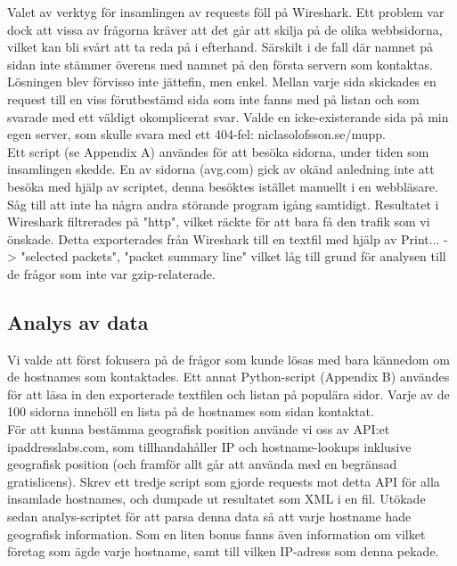 \documentclass[a4paper]{article}
\begin{document}
Valet av verktyg för insamlingen av requests föll på Wireshark. Ett problem var dock att vissa av frågorna kräver att det går att skilja på de olika webbsidorna, vilket kan bli svårt att ta reda på i efterhand. Särskilt i de fall där namnet på sidan inte stämmer överens med namnet på den första servern som kontaktas. Lösningen blev förvisso inte jättefin, men enkel. Mellan varje sida skickades en request till en viss förutbestämd sida som inte fanns med på listan och som svarade med ett väldigt okomplicerat svar. Valde en icke-existerande sida på min egen server, som skulle svara med ett 404-fel: niclasolofsson.se/mupp.\\

Ett script (se Appendix A) användes för att besöka sidorna, under tiden som insamlingen skedde. En av sidorna (avg.com) gick av okänd anledning inte att besöka med hjälp av scriptet, denna besöktes istället manuellt i en webbläsare.\\

Såg till att inte ha några andra störande program igång samtidigt. Resultatet i Wireshark filtrerades på "http", vilket räckte för att bara få den trafik som vi önskade. Detta exporterades från Wireshark till en textfil med hjälp av Print... -> "selected packets", "packet summary line" vilket låg till grund för analysen till de frågor som inte var gzip-relaterade.


\subsection{Analys av data}
Vi valde att först fokusera på de frågor som kunde lösas med bara kännedom om de hostnames som kontaktades. Ett annat Python-script (Appendix B) användes för att läsa in den exporterade textfilen och listan på populära sidor. Varje av de 100 sidorna innehöll en lista på de hostnames som sidan kontaktat.\\

För att kunna bestämma geografisk position använde vi oss av API:et ipaddresslabs.com, som tillhandahåller IP och hostname-lookups inklusive geografisk position (och framför allt går att använda med en begränsad gratislicens). Skrev ett tredje script som gjorde requests mot detta API för alla insamlade hostnames, och dumpade ut resultatet som XML i en fil. Utökade sedan analys-scriptet för att parsa denna data så att varje hostname hade geografisk information. Som en liten bonus fanns även information om vilket företag som ägde varje hostname, samt till vilken IP-adress som denna pekade.\\
\end{document}
